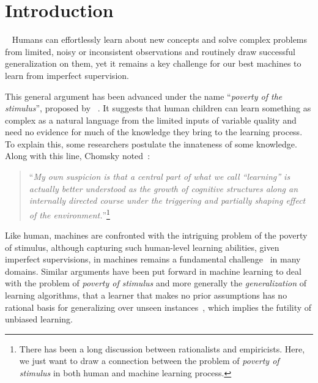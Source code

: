 \chapter{Introduction}
~
Humans can effortlessly learn about new concepts and solve complex problems from limited, noisy or inconsistent observations and routinely draw successful generalization on them, yet it remains a key challenge for our best machines to learn from imperfect supervision.

This general argument has been advanced under the name ``\emph{poverty of the stimulus}'', proposed by ~\citet{chomsky1980rules}. It suggests that human children can learn something as complex as a natural language from the limited inputs of variable quality and need no evidence for much of the knowledge they bring to the learning process. 
To explain this, some researchers postulate the innateness of some knowledge.
%
Along with this line, Chomsky noted~\citep{chomsky1980rules}:
\begin{quote}
    ``\emph{My own suspicion is that a central part of what we call “learning” is actually better understood as the growth of cognitive structures along an internally directed course under the triggering and partially shaping effect of the environment.}''\footnote{There has been a long discussion between rationalists and empiricists. Here, we just want to draw a connection between the problem of \emph{poverty of stimulus} in both human and machine learning process.}
\end{quote}

Like human, machines are confronted with the intriguing problem of the poverty of stimulus, although capturing such human-level learning abilities, given imperfect supervisions, in machines remains a fundamental challenge~\citep{lake2017building} in many domains. 
%
Similar arguments have been put forward in machine learning to deal with the problem of \emph{poverty of stimulus} and more generally the \emph{generalization} of learning algorithms, that a learner that makes no prior assumptions has no rational basis for generalizing over unseen instances~\citep{Mitchell:1997:ML}, which implies the futility of unbiased learning. %

